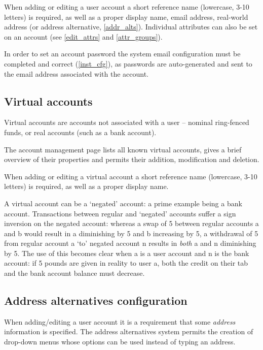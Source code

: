 \documentclass{report}
\begin{document}
When adding or editing a user account a short reference name (lowercase, 3-10 letters) is required, as well as a proper display name, email address, real-world address (or address alternative, \autoref{addr_alts}).  Individual attributes can also be set on an account (see \autoref{edit_attrs} and \autoref{attr_groups}).

In order to set an account password the system email configuration must be completed and correct (\autoref{inst_cfg}), as passwords are auto-generated and sent to the email address associated with the account.

\subsection{Virtual accounts}\label{manage_vaccts}

Virtual accounts are accounts not associated with a user -- nominal ring-fenced funds, or real accounts (such as a bank account).

The account management page lists all known virtual accounts, gives a brief overview of their properties and permits their addition, modification and deletion.

When adding or editing a virtual account a short reference name (lowercase, 3-10 letters) is required, as well as a proper display name.

A virtual account can be a `negated' account: a prime example being a bank account.  Transactions between regular and `negated' accounts suffer a sign inversion on the negated account: whereas a swap of 5 between regular accounts a and b would result in a diminishing by 5 and b increasing by 5, a withdrawal of 5 from regular account a `to' negated account n results in \emph{both} a and n diminishing by 5.  The use of this becomes clear when a is a user account and n is the bank account: if 5 pounds are given in reality to user a, both the credit on their tab and the bank account balance must decrease.

\subsection{Address alternatives configuration}\label{addr_alts}

When adding/editing a user account it is a requirement that some \textit{address} information is specified.  The address alternatives system permits the creation of drop-down menus whose options can be used instead of typing an address.
\end{document}
